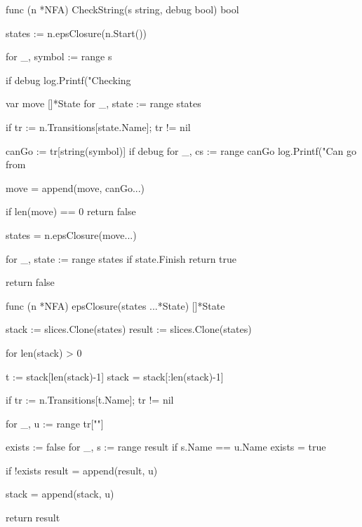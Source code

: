 func (n *NFA) CheckString(s string, debug bool) bool {
	states := n.epsClosure(n.Start())

	for _, symbol := range s {
		if debug {
			log.Printf("Checking %
		}

		var move []*State
		for _, state := range states {
			if tr := n.Transitions[state.Name]; tr != nil {
				canGo := tr[string(symbol)]
				if debug {
					for _, cs := range canGo {
						log.Printf("Can go from %
					}
				}

				move = append(move, canGo...)
			}
		}

		if len(move) == 0 {
			return false
		}

		states = n.epsClosure(move...)
	}

	for _, state := range states {
		if state.Finish {
			return true
		}
	}

	return false
}

func (n *NFA) epsClosure(states ...*State) []*State {
	stack := slices.Clone(states)
	result := slices.Clone(states)

	for len(stack) > 0 {
		t := stack[len(stack)-1]
		stack = stack[:len(stack)-1]

		if tr := n.Transitions[t.Name]; tr != nil {
			for _, u := range tr[""] {
				exists := false
				for _, s := range result {
					if s.Name == u.Name {
						exists = true
					}
				}

				if !exists {
					result = append(result, u)
				}

				stack = append(stack, u)
			}
		}
	}

	return result
}